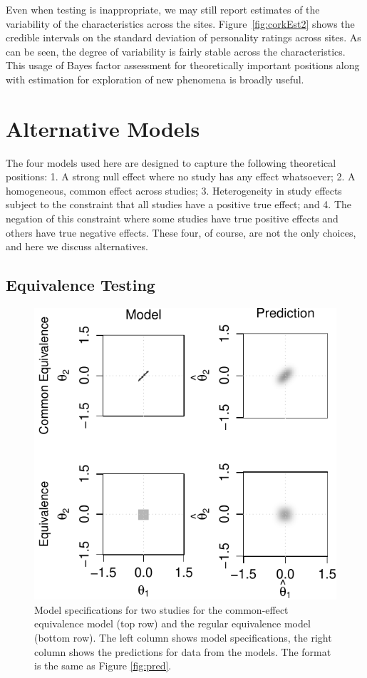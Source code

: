 \documentclass[english,man]{apa6}
\theoremstyle{definition}
\theoremstyle{definition}
\theoremstyle{definition}
\theoremstyle{remark}
\begin{document}
Even when testing is inappropriate, we may still report estimates of the
variability of the characteristics across the sites.
Figure~\ref{fig:corkEst2} shows the credible intervals on the standard
deviation of personality ratings across sites. As can be seen, the
degree of variability is fairly stable across the characteristics. This
usage of Bayes factor assessment for theoretically important positions
along with estimation for exploration of new phenomena is broadly
useful.

\section{Alternative Models}\label{alternative-models}

The four models used here are designed to capture the following
theoretical positions: 1. A strong null effect where no study has any
effect whatsoever; 2. A homogeneous, common effect across studies; 3.
Heterogeneity in study effects subject to the constraint that all
studies have a positive true effect; and 4. The negation of this
constraint where some studies have true positive effects and others have
true negative effects. These four, of course, are not the only choices,
and here we discuss alternatives.

\subsection{Equivalence Testing}\label{equivalence-testing}

\begin{figure}[htbp]
\centering
\includegraphics{p_files/figure-latex/fig-equivalence-1.pdf}
\caption{\label{fig:fig-equivalence}Model specifications for two studies for
the common-effect equivalence model (top row) and the regular
equivalence model (bottom row). The left column shows model
specifications, the right column shows the predictions for data from the
models. The format is the same as Figure \ref{fig:pred}.}
\end{figure}
\end{document}
